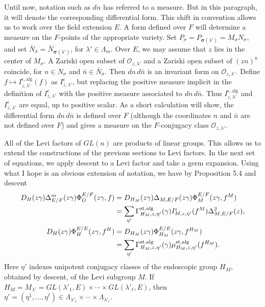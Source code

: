 \documentclass{amsart}
\begin{document}
Until now, notation such as $dn$ has referred to a measure.  But in
this paragraph, it will denote the corresponding differential form.
This shift in convention allows us to work over the field extension
$E$.  A form defined over $F$ will determine a measure on the
$F$-points of the appropriate variety.
Set $P_\sigma = P_{\pmb\sigma(\lambda')} = M_\sigma N_\sigma$, and set 
$\bar N_\sigma= \bar N_{\pmb\sigma(\lambda')}$, for 
$\lambda'\in \Lambda_m$.   
Over $E$, we may assume that $z$ lies in the center of $M_\sigma$.
A Zariski open subset of ${\mathcal O}_{z,\lambda'}$ and a Zariski open subset
of $(zn)^{\bar n}$ coincide, for $n\in N_\sigma$ and $\bar n\in \bar N_\sigma$.
Then $dn\,d\bar n$ is an invariant form on ${\mathcal O}_{z,\lambda'}$.
Define $f\mapsto I^{\epsilon,\text{alg}}_{z,\lambda'}(f)$ as $I^{\epsilon}_{z,\lambda'}$,
but replacing the positive measure implicit in the definition of $I^{\epsilon}_{z,\lambda'}$
with the positive measure associated to $dn\,d\bar n$.  
Thus $I^{\epsilon,\text{alg}}_{z,\lambda'}$
and $I^\epsilon_{z,\lambda'}$ are equal, up to positive scalar.
As a short calculation will show, the differential form $dn\,d\bar n$ 
is defined over $F$
(although the coordinates
$n$ and $\bar n$ are not defined over $F$)
and gives a measure on the $F$-conjugacy class ${\mathcal O}_{z,\lambda'}$.


All of the Levi factors of $GL(n)$ are products of linear groups.  This
allows us to extend the constructions of the previous sections to Levi factors.
In the next set of equations, we apply descent to a Levi factor and take
a germ expansion.  Using what I hope is an obvious extension of notation,
we have by Proposition 5.4 and descent
\begin{align}
  D_{H}(z\gamma)\Delta^m_{E/F}(z\gamma)\Phi^{E/F}_G(z\gamma,f)
  &=
    D_{H_M}(z\gamma)\Delta_{M,E/F}(z\gamma)\Phi^{E/F}_M(z\gamma,f^M) \\
\vspace{4pt}
  &=
    \sum_{\eta'} \Gamma^{\text{st,alg}}_{H_M,z,\eta'}(\gamma)
                 I^{\epsilon}_{M,z,\eta'}(f^M)
  \Delta_{M,E/F}^{2}(z),\label{eqn:6.5} \\ %
%
D_{H}(z\gamma)\Phi^{E/E}_H(z\gamma,f^H)
  &=
     D_{H_M}(z\gamma)\Phi^{E/E}_{H_M}(z\gamma,f^{H_M}) \\
\vspace{4pt}
    &=
     \sum_{\eta'}\Gamma^{\text{st,alg}}_{H_M,z,\eta'}(\gamma)
                 \mu^{\text{st,alg}}_{H_M,z,\eta'}(f^{H_M}). \label{eqn:6.6}
\end{align}
Here $\eta'$ indexes unipotent conjugacy classes of the endoscopic group $H_M$,
obtained by descent, of the Levi subgroup $M$.  If
$H_M = M_{\lambda'} = GL(\lambda'_1,E)\times\cdots\times GL(\lambda'_\ell,E)$, then
$\eta' = (\eta^1,\ldots,\eta^\ell)\in
   \Lambda_{\lambda'_1}\times\cdots\times \Lambda_{\lambda'_\ell}$.
\end{document}
